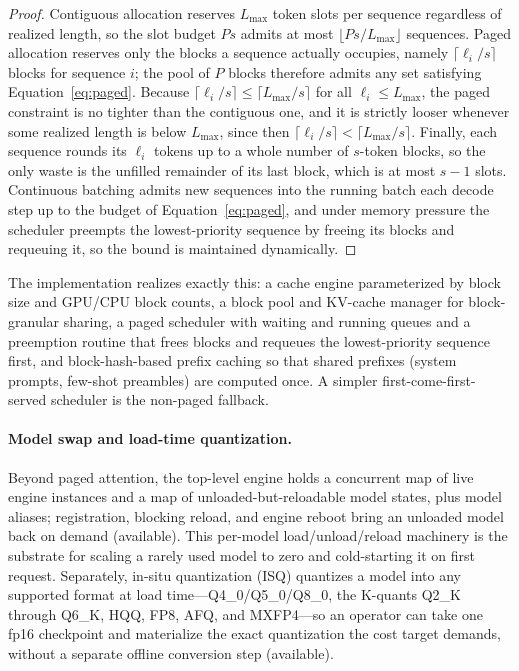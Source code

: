 \documentclass[11pt]{article}
\begin{document}
\begin{proof}
Contiguous allocation reserves $L_{\max}$ token slots per sequence regardless of realized length, so the slot budget $Ps$ admits at most $\lfloor Ps/L_{\max}\rfloor$ sequences. Paged allocation reserves only the blocks a sequence actually occupies, namely $\lceil \ell_i/s\rceil$ blocks for sequence $i$; the pool of $P$ blocks therefore admits any set satisfying Equation~\eqref{eq:paged}. Because $\lceil \ell_i/s\rceil \le \lceil L_{\max}/s\rceil$ for all $\ell_i \le L_{\max}$, the paged constraint is no tighter than the contiguous one, and it is strictly looser whenever some realized length is below $L_{\max}$, since then $\lceil \ell_i/s\rceil < \lceil L_{\max}/s\rceil$. Finally, each sequence rounds its $\ell_i$ tokens up to a whole number of $s$-token blocks, so the only waste is the unfilled remainder of its last block, which is at most $s-1$ slots. Continuous batching admits new sequences into the running batch each decode step up to the budget of Equation~\eqref{eq:paged}, and under memory pressure the scheduler preempts the lowest-priority sequence by freeing its blocks and requeuing it, so the bound is maintained dynamically.
\end{proof}

The implementation realizes exactly this: a cache engine parameterized by block size and GPU/CPU block counts, a block pool and KV-cache manager for block-granular sharing, a paged scheduler with waiting and running queues and a preemption routine that frees blocks and requeues the lowest-priority sequence first, and block-hash-based prefix caching so that shared prefixes (system prompts, few-shot preambles) are computed once. A simpler first-come-first-served scheduler is the non-paged fallback.

\paragraph{Model swap and load-time quantization.} Beyond paged attention, the top-level engine holds a concurrent map of live engine instances and a map of unloaded-but-reloadable model states, plus model aliases; registration, blocking reload, and engine reboot bring an unloaded model back on demand (available). This per-model load/unload/reload machinery is the substrate for scaling a rarely used model to zero and cold-starting it on first request. Separately, in-situ quantization (ISQ) quantizes a model into any supported format at load time---Q4\_0/Q5\_0/Q8\_0, the K-quants Q2\_K through Q6\_K, HQQ, FP8, AFQ, and MXFP4---so an operator can take one fp16 checkpoint and materialize the exact quantization the cost target demands, without a separate offline conversion step (available).
\end{document}
